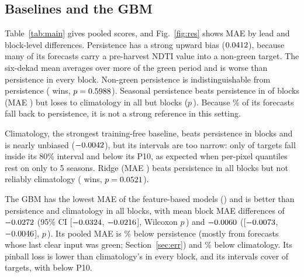 \documentclass[journal]{IEEEtran}
\newcommand{\ci}[2]{[$#1$, $#2$]}
\begin{document}
\subsection{Baselines and the GBM}
\label{sec:base}
Table~\ref{tab:main} gives pooled scores, and Fig.~\ref{fig:res} shows MAE by lead and block-level differences. Persistence has a strong upward bias ($0.0412$), because many of its forecasts carry a pre-harvest NDTI value into a non-green target. The six-dekad mean averages over more of the green period and is worse than persistence in every block. Non-green persistence is indistinguishable from persistence (\finPersNGVsPersWins{} wins, $p=0.5988$). Seasonal persistence beats persistence in \finSeasVsPersWins{} of \finNTestBlocks{} blocks (MAE \finSeasMAE) but loses to climatology in all but \finSeasVsClimWins{} blocks ($p$\,\finSeasVsClimP). Because \finxFallbackSeas\% of its forecasts fall back to persistence, it is not a strong reference in this setting.

Climatology, the strongest training-free baseline, beats persistence in \finClimVsPersWins{} blocks and is nearly unbiased ($-0.0042$), but its intervals are too narrow: only \finyClimCov{} of targets fall inside its 80\% interval and \finyClimBelow{} below its P10, as expected when per-pixel quantiles rest on only \finxClimMinYears{} to 5 seasons. Ridge (MAE \finRidgeMAE) beats persistence in all \finNTestBlocks{} blocks but not reliably climatology (\finRidgeVsClimWins{} wins, $p=0.0521$).

The GBM has the lowest MAE of the feature-based models (\finGbmMAE) and is better than persistence and climatology in all \finNTestBlocks{} blocks, with mean block MAE differences of $-0.0272$ (95\% CI \ci{\finGbmVsPersLo}{\finGbmVsPersHi}, Wilcoxon $p$\,\finGbmVsPersP) and $-0.0060$ (\ci{\finGbmVsClimLo}{\finGbmVsClimHi}, $p$\,\finGbmVsClimP). Its pooled MAE is \finxGbmRelMAEVsPers\% below persistence (mostly from forecasts whose last clear input was green; Section~\ref{sec:err}) and \finxGbmRelMAEVsClim\% below climatology. Its pinball loss is lower than climatology's in every block, and its intervals cover \finyGbmCov{} of targets, with \finyGbmBelow{} below P10.
\end{document}

